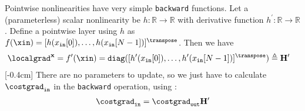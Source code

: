Pointwise nonlinearities have very simple \texttt{backward} functions. Let a (parameterless) scalar nonlinearity be $h: \mathbb{R} \rightarrow \mathbb{R}$ with derivative function $h^{\prime}: \mathbb{R} \rightarrow \mathbb{R}$. Define a  pointwise layer using $h$ as $f(\xin) = [h(x_{\texttt{in}}[0]), \ldots, h(x_{\texttt{in}}[N-1])]^\transpose$. Then we have
\begin{align}
    \localgrad^{\mathbf{x}} & = f^{\prime}(\xin) = \texttt{diag}([h^\prime(x_{\texttt{in}}[0]), \ldots, h^\prime(x_{\texttt{in}}[N-1])]^\transpose) \triangleq \mathbf{H}^\prime
\end{align}
[-0.4cm]
There are no parameters to update, so we just have to calculate $\costgrad_{\texttt{in}}$ in the \texttt{backward} operation, using \eqn{\ref{eqn:backpropagation:backward}}:
\begin{align}
    \costgrad_{\texttt{in}} = \costgrad_{\texttt{out}}\mathbf{H}^\prime
\end{align}

